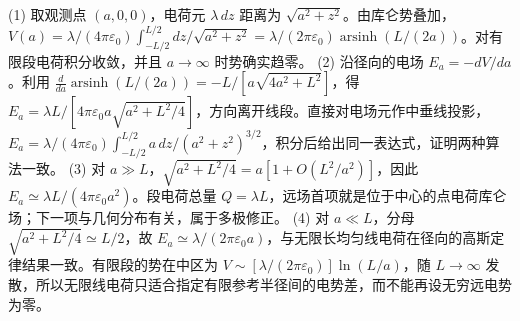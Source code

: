 (1) 取观测点 \((a,0,0)\)，电荷元 \(\lambda\,dz\) 距离为 \(\sqrt{a^2+z^2}\)。由库仑势叠加，\(V(a)=\lambda/(4\pi\varepsilon_0)\int_{-L/2}^{L/2}dz/\sqrt{a^2+z^2}=\lambda/(2\pi\varepsilon_0)\operatorname{arsinh}(L/(2a))\)。对有限段电荷积分收敛，并且 \(a\to\infty\) 时势确实趋零。
(2) 沿径向的电场 \(E_a=-dV/da\)。利用 \(\frac d{da}\operatorname{arsinh}(L/(2a))=-L/[a\sqrt{4a^2+L^2}]\)，得 \(E_a=\lambda L/[4\pi\varepsilon_0 a\sqrt{a^2+L^2/4}]\)，方向离开线段。直接对电场元作中垂线投影，\(E_a=\lambda/(4\pi\varepsilon_0)\int_{-L/2}^{L/2}a\,dz/(a^2+z^2)^{3/2}\)，积分后给出同一表达式，证明两种算法一致。
(3) 对 \(a\gg L\)，\(\sqrt{a^2+L^2/4}=a[1+O(L^2/a^2)]\)，因此 \(E_a\simeq\lambda L/(4\pi\varepsilon_0a^2)\)。段电荷总量 \(Q=\lambda L\)，远场首项就是位于中心的点电荷库仑场；下一项与几何分布有关，属于多极修正。
(4) 对 \(a\ll L\)，分母 \(\sqrt{a^2+L^2/4}\simeq L/2\)，故 \(E_a\simeq\lambda/(2\pi\varepsilon_0a)\)，与无限长均匀线电荷在径向的高斯定律结果一致。有限段的势在中区为 \(V\sim[\lambda/(2\pi\varepsilon_0)]\ln(L/a)\)，随 \(L\to\infty\) 发散，所以无限线电荷只适合指定有限参考半径间的电势差，而不能再设无穷远电势为零。
